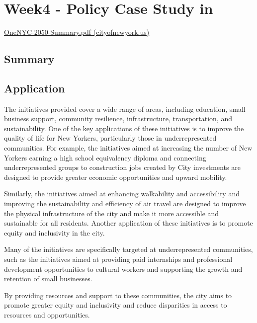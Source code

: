 \documentclass[
  letterpaper,
  DIV=11,
  numbers=noendperiod]{scrreprt}
\begin{document}

\hypertarget{week4---policy-case-study-in}{%
\chapter{Week4 - Policy Case Study
in}\label{week4---policy-case-study-in}}

\href{https://onenyc.cityofnewyork.us/wp-content/uploads/2019/05/OneNYC-2050-Summary.pdf}{OneNYC-2050-Summary.pdf
(cityofnewyork.us)}

\hypertarget{summary-2}{%
\section{Summary}\label{summary-2}}

\hypertarget{application-1}{%
\section{Application}\label{application-1}}

The initiatives provided cover a wide range of areas, including
education, small business support, community resilience, infrastructure,
transportation, and sustainability. One of the key applications of these
initiatives is to improve the quality of life for New Yorkers,
particularly those in underrepresented communities. For example, the
initiatives aimed at increasing the number of New Yorkers earning a high
school equivalency diploma and connecting underrepresented groups to
construction jobs created by City investments are designed to provide
greater economic opportunities and upward mobility.

Similarly, the initiatives aimed at enhancing walkability and
accessibility and improving the sustainability and efficiency of air
travel are designed to improve the physical infrastructure of the city
and make it more accessible and sustainable for all residents. Another
application of these initiatives is to promote equity and inclusivity in
the city.

Many of the initiatives are specifically targeted at underrepresented
communities, such as the initiatives aimed at providing paid internships
and professional development opportunities to cultural workers and
supporting the growth and retention of small businesses.

By providing resources and support to these communities, the city aims
to promote greater equity and inclusivity and reduce disparities in
access to resources and opportunities.
\end{document}
